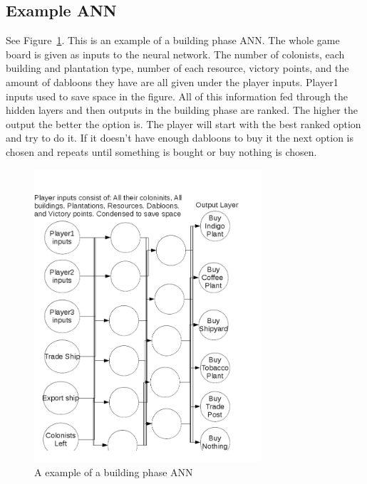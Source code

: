 \subsection{Example ANN}
See Figure~\ref{ANN}.  This is an example of a building phase ANN. The whole game board is given as inputs to the neural network. The number of colonists, each building and plantation type, number of each resource, victory points, and the amount of dabloons they have are all given under the player inputs. Player1 inputs used to save space in the figure. All of this information fed through the hidden layers and then outputs in the building phase are ranked. The higher the output the better the option is. The player will start with the best ranked option and try to do it. If it doesn't have enough dabloons to buy it the next option is chosen and repeats until something is bought or buy nothing is chosen.
\begin{figure}[tbh]
\begin{center}
\includegraphics[width=0.75\textwidth]{./images/Example_ANN.png}
\end{center}
\caption{A example of a building phase ANN \label{ANN}}
\end{figure}
